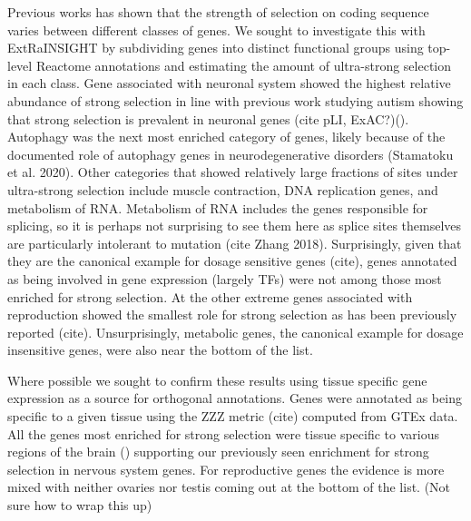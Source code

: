 \documentclass[11pt]{article}
\begin{document}
Previous works has shown that the strength of selection on coding sequence varies between different classes of genes. We sought to investigate this with ExtRaINSIGHT by subdividing genes into distinct functional groups using top-level Reactome annotations and estimating the amount of ultra-strong selection in each class. Gene associated with neuronal system showed the highest relative abundance of strong selection in line with previous work studying autism showing that strong selection is prevalent in neuronal genes (cite pLI, ExAC?)(). Autophagy was the next most enriched category of genes, likely because of the documented role of autophagy genes in neurodegenerative disorders (Stamatoku et al. 2020). Other categories that showed relatively large fractions of sites under ultra-strong selection include muscle contraction, DNA replication genes, and metabolism of RNA. Metabolism of RNA includes the genes responsible for splicing, so it is perhaps not surprising to see them here as splice sites themselves are particularly intolerant to mutation (cite Zhang 2018). Surprisingly, given that they are the canonical example for dosage sensitive genes (cite), genes annotated as being involved in gene expression (largely TFs) were not among those most enriched for strong selection. At the other extreme genes associated with reproduction showed the smallest role for strong selection as has been previously reported (cite). Unsurprisingly, metabolic genes, the canonical example for dosage insensitive genes, were also near the bottom of the list.

Where possible we sought to confirm these results using tissue specific gene expression as a source for orthogonal annotations. Genes were annotated as being specific to a given tissue using the ZZZ metric (cite) computed from GTEx data. All the genes most enriched for strong selection were tissue specific to various regions of the brain () supporting our previously seen enrichment for strong selection in nervous system genes. For reproductive genes the evidence is more mixed with neither ovaries nor testis coming out at the bottom of the list. (Not sure how to wrap this up)
\end{document}
